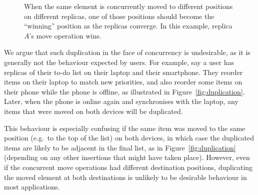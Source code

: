 \documentclass[sigplan,10pt]{acmart}
\begin{document}
\begin{figure}
    \caption{When the same element is concurrently moved to different positions on different replicas, one of those positions should become the ``winning'' position as the replicas converge. In this example, replica $A$'s move operation wins.}
    \label{fig:concurrent}
\end{figure}

We argue that such duplication in the face of concurrency is undesirable, as it is generally not the behaviour expected by users.
For example, say a user has replicas of their to-do list on their laptop and their smartphone.
They reorder items on their laptop to match new priorities, and also reorder some items on their phone while the phone is offline, as illustrated in Figure~\ref{fig:duplication}.
Later, when the phone is online again and synchronises with the laptop, any items that were moved on both devices will be duplicated.

This behaviour is especially confusing if the same item was moved to the same position (e.g.\ to the top of the list) on both devices, in which case the duplicated items are likely to be adjacent in the final list, as in Figure~\ref{fig:duplication} (depending on any other insertions that might have taken place).
However, even if the concurrent move operations had different destination positions, duplicating the moved element at both destinations is unlikely to be desirable behaviour in most applications.
\end{document}
